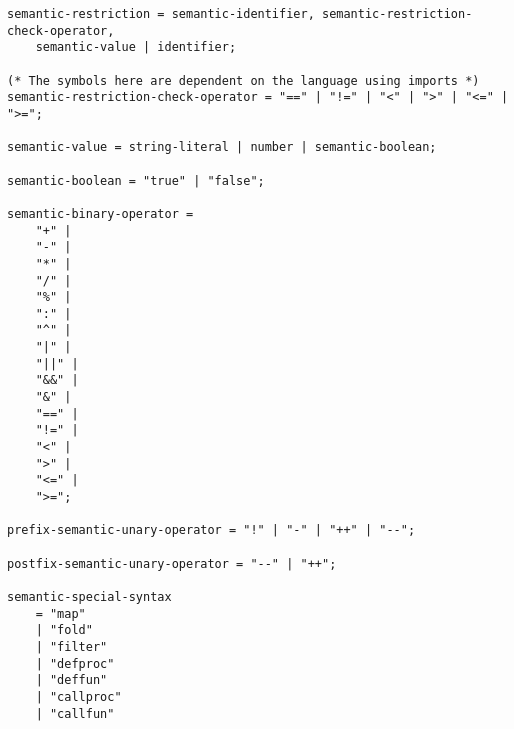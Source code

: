 \begin{verbatim}
semantic-restriction = semantic-identifier, semantic-restriction-check-operator,
    semantic-value | identifier;

(* The symbols here are dependent on the language using imports *)
semantic-restriction-check-operator = "==" | "!=" | "<" | ">" | "<=" | ">=";

semantic-value = string-literal | number | semantic-boolean;

semantic-boolean = "true" | "false";

semantic-binary-operator = 
    "+" |
    "-" |
    "*" |
    "/" |
    "%" |
    ":" |
    "^" |
    "|" |
    "||" |
    "&&" |
    "&" |
    "==" |
    "!=" |
    "<" |
    ">" |
    "<=" |
    ">=";

prefix-semantic-unary-operator = "!" | "-" | "++" | "--";

postfix-semantic-unary-operator = "--" | "++";

semantic-special-syntax 
    = "map"
    | "fold"
    | "filter"
    | "defproc"
    | "deffun"
    | "callproc"
    | "callfun"

\end{verbatim}

